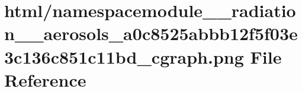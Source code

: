 \hypertarget{namespacemodule____radiation____aerosols__a0c8525abbb12f5f03e3c136c851c11bd__cgraph_8png}{}\section{html/namespacemodule\+\_\+\+\_\+radiation\+\_\+\+\_\+aerosols\+\_\+a0c8525abbb12f5f03e3c136c851c11bd\+\_\+cgraph.png File Reference}
\label{namespacemodule____radiation____aerosols__a0c8525abbb12f5f03e3c136c851c11bd__cgraph_8png}

